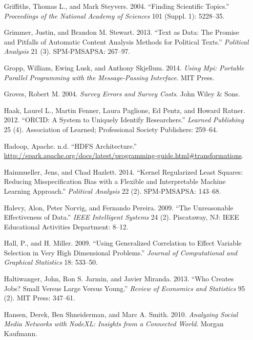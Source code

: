 \documentclass[]{krantz}
\begin{document}
\hypertarget{ref-griffiths-04}{}
Griffiths, Thomas L., and Mark Steyvers. 2004. ``Finding Scientific
Topics.'' \emph{Proceedings of the National Academy of Sciences} 101
(Suppl. 1): 5228--35.

\hypertarget{ref-grimmer2013text}{}
Grimmer, Justin, and Brandon M. Stewart. 2013. ``Text as Data: The
Promise and Pitfalls of Automatic Content Analysis Methods for Political
Texts.'' \emph{Political Analysis} 21 (3). SPM-PMSAPSA: 267--97.

\hypertarget{ref-mpi}{}
Gropp, William, Ewing Lusk, and Anthony Skjellum. 2014. \emph{Using Mpi:
Portable Parallel Programming with the Message-Passing Interface}. MIT
Press.

\hypertarget{ref-groves2004survey}{}
Groves, Robert M. 2004. \emph{Survey Errors and Survey Costs}. John
Wiley \& Sons.

\hypertarget{ref-haak2012orcid}{}
Haak, Laurel L., Martin Fenner, Laura Paglione, Ed Pentz, and Howard
Ratner. 2012. ``ORCID: A System to Uniquely Identify Researchers.''
\emph{Learned Publishing} 25 (4). Association of Learned; Professional
Society Publishers: 259--64.

\hypertarget{ref-SparkTransformation}{}
Hadoop, Apache. n.d. ``HDFS Architecture.''
\url{http://spark.apache.org/docs/latest/programming-guide.html\#transformations}.

\hypertarget{ref-hainmueller2014kernel}{}
Hainmueller, Jens, and Chad Hazlett. 2014. ``Kernel Regularized Least
Squares: Reducing Misspecification Bias with a Flexible and
Interpretable Machine Learning Approach.'' \emph{Political Analysis} 22
(2). SPM-PMSAPSA: 143--68.

\hypertarget{ref-halevy-09}{}
Halevy, Alon, Peter Norvig, and Fernando Pereira. 2009. ``The
Unreasonable Effectiveness of Data.'' \emph{IEEE Intelligent Systems} 24
(2). Piscataway, NJ: IEEE Educational Activities Department: 8--12.

\hypertarget{ref-HallMiller2009}{}
Hall, P., and H. Miller. 2009. ``Using Generalized Correlation to Effect
Variable Selection in Very High Dimensional Problems.'' \emph{Journal of
Computational and Graphical Statistics} 18: 533--50.

\hypertarget{ref-haltiwanger2013creates}{}
Haltiwanger, John, Ron S. Jarmin, and Javier Miranda. 2013. ``Who
Creates Jobs? Small Versus Large Versus Young.'' \emph{Review of
Economics and Statistics} 95 (2). MIT Press: 347--61.

\hypertarget{ref-hansen2010analyzing}{}
Hansen, Derek, Ben Shneiderman, and Marc A. Smith. 2010. \emph{Analyzing
Social Media Networks with NodeXL: Insights from a Connected World}.
Morgan Kaufmann.
\end{document}
